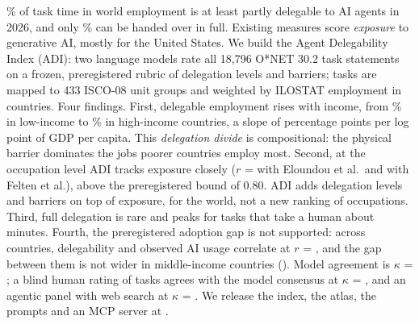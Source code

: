 \% of task time in world employment is at least partly delegable to AI agents in 2026, and only \% can be handed over in full.
Existing measures score \emph{exposure} to generative AI, mostly for the United States.
We build the Agent Delegability Index (ADI): two language models rate all 18,796 O*NET 30.2 task statements on a frozen, preregistered rubric of delegation levels and barriers; tasks are mapped to 433 ISCO-08 unit groups and weighted by ILOSTAT employment in  countries.
Four findings.
First, delegable employment rises with income, from \% in low-income to \% in high-income countries, a slope of  percentage points per log point of GDP per capita.
This \emph{delegation divide} is compositional: the physical barrier dominates the jobs poorer countries employ most.
Second, at the occupation level ADI tracks exposure closely ($r$ =  with Eloundou et al.\ and  with Felten et al.), above the preregistered bound of 0.80.
ADI adds delegation levels and barriers on top of exposure, for the world, not a new ranking of occupations.
Third, full delegation is rare and peaks for tasks that take a human about  minutes.
Fourth, the preregistered adoption gap is not supported: across  countries, delegability and observed AI usage correlate at $r$ = , and the gap between them is not wider in middle-income countries ().
Model agreement is $\kappa$ = ; a blind human rating of  tasks agrees with the model consensus at $\kappa$ = , and an agentic panel with web search at $\kappa$ = .
We release the index, the atlas, the prompts and an MCP server at \repourl.
